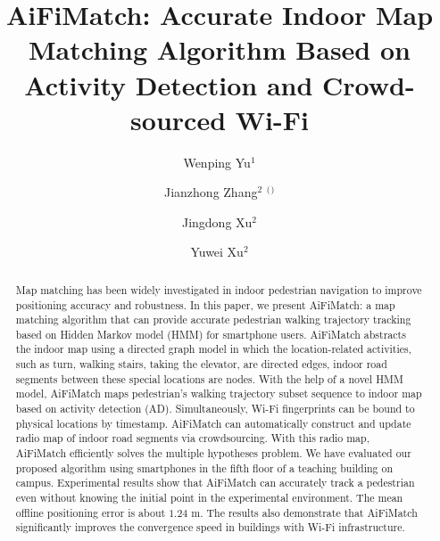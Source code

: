 \documentclass{llncs}
\begin{document}
%
\title{AiFiMatch: Accurate Indoor Map Matching Algorithm Based on Activity Detection and Crowd-sourced Wi-Fi}
%

\author{Wenping Yu$^1$\and Jianzhong Zhang$^2$ $^($\Envelope$^)$\and Jingdong Xu$^2$ \and Yuwei Xu$^2$}
%
%
%


\maketitle              %

\begin{abstract}

Map matching has been widely investigated in indoor pedestrian navigation to improve positioning accuracy and robustness. In this paper, we present AiFiMatch: a map matching algorithm that can provide accurate pedestrian walking trajectory  tracking based on Hidden Markov model (HMM) for smartphone users. AiFiMatch abstracts the indoor map using a directed graph model in which the location-related activities, such as turn, walking stairs, taking the elevator, are directed edges, indoor road segments between these special locations are nodes. With the help of a novel HMM model, AiFiMatch maps pedestrian's walking trajectory subset sequence to indoor map based on activity detection (AD). Simultaneously, Wi-Fi fingerprints can be bound to physical locations by timestamp. AiFiMatch can automatically construct and update radio map of indoor road segments via crowdsourcing. With this radio map, AiFiMatch  efficiently solves the multiple hypotheses problem. We have evaluated our proposed algorithm using smartphones in the fifth floor of a teaching building on campus. Experimental results show that AiFiMatch can accurately track a pedestrian even without knowing the initial point in the experimental environment.  The mean offline positioning error is about $1.24$ m. The results also demonstrate that AiFiMatch significantly improves the convergence speed in buildings with Wi-Fi infrastructure.

\end{abstract}
%
\end{document}

